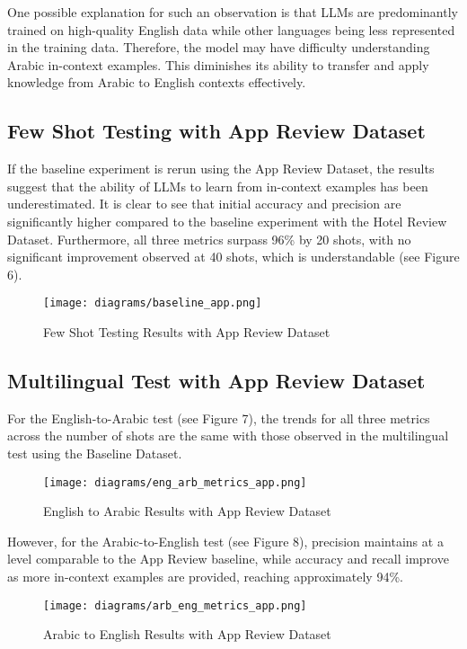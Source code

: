 \documentclass[sigconf, nonacm]{acmart}
\theoremstyle{definition}
\begin{document}
One possible explanation for such an observation is that LLMs are predominantly trained on high-quality English data while other languages being less represented in the training data. Therefore, the model may have difficulty understanding Arabic in-context examples. This diminishes its ability to transfer and apply knowledge from Arabic to English contexts effectively.

\subsection{Few Shot Testing with App Review Dataset}

If the baseline experiment is rerun using the App Review Dataset, the results suggest that the ability of LLMs to learn from in-context examples has been underestimated. It is clear to see that initial accuracy and precision are significantly higher compared to the baseline experiment with the Hotel Review Dataset. Furthermore, all three metrics surpass 96\% by 20 shots, with no significant improvement observed at 40 shots, which is understandable (see Figure 6).

\begin{figure}[h]
  \centering
  \texttt{[image: diagrams/baseline\_app.png]}
  \caption{Few Shot Testing Results with App Review Dataset}
\end{figure}

\subsection{Multilingual Test with App Review Dataset}

For the English-to-Arabic test (see Figure 7), the trends for all three metrics across the number of shots are the same with those observed in the multilingual test using the Baseline Dataset.

\begin{figure}[h]
  \centering
  \texttt{[image: diagrams/eng\_arb\_metrics\_app.png]}
  \caption{English to Arabic Results with App Review Dataset}
\end{figure}

However, for the Arabic-to-English test (see Figure 8), precision maintains at a level comparable to the App Review baseline, while accuracy and recall improve as more in-context examples are provided, reaching approximately 94\%.

\begin{figure}[h]
  \centering
  \texttt{[image: diagrams/arb\_eng\_metrics\_app.png]}
  \caption{Arabic to English Results with App Review Dataset}
\end{figure}
\end{document}
